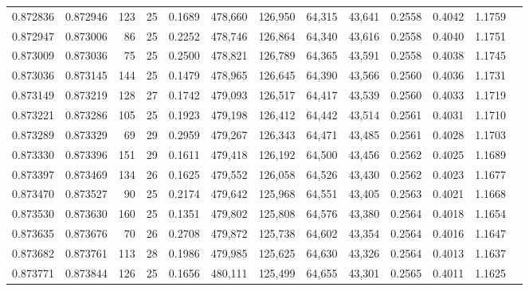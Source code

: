 \begin{tabular}{rrrrrrrrrrrrr}
0.872836 & 0.872946 &   123 &  25 &                                     0.1689 & 478,660 & 126,950 &  64,315 &  43,641 & 0.2558 & 0.4042 & 1.1759 \\
0.872947 & 0.873006 &    86 &  25 &                                     0.2252 & 478,746 & 126,864 &  64,340 &  43,616 & 0.2558 & 0.4040 & 1.1751 \\
0.873009 & 0.873036 &    75 &  25 &                                     0.2500 & 478,821 & 126,789 &  64,365 &  43,591 & 0.2558 & 0.4038 & 1.1745 \\
0.873036 & 0.873145 &   144 &  25 &                                     0.1479 & 478,965 & 126,645 &  64,390 &  43,566 & 0.2560 & 0.4036 & 1.1731 \\
0.873149 & 0.873219 &   128 &  27 &                                     0.1742 & 479,093 & 126,517 &  64,417 &  43,539 & 0.2560 & 0.4033 & 1.1719 \\
0.873221 & 0.873286 &   105 &  25 &                                     0.1923 & 479,198 & 126,412 &  64,442 &  43,514 & 0.2561 & 0.4031 & 1.1710 \\
0.873289 & 0.873329 &    69 &  29 &                                     0.2959 & 479,267 & 126,343 &  64,471 &  43,485 & 0.2561 & 0.4028 & 1.1703 \\
0.873330 & 0.873396 &   151 &  29 &                                     0.1611 & 479,418 & 126,192 &  64,500 &  43,456 & 0.2562 & 0.4025 & 1.1689 \\
0.873397 & 0.873469 &   134 &  26 &                                     0.1625 & 479,552 & 126,058 &  64,526 &  43,430 & 0.2562 & 0.4023 & 1.1677 \\
0.873470 & 0.873527 &    90 &  25 &                                     0.2174 & 479,642 & 125,968 &  64,551 &  43,405 & 0.2563 & 0.4021 & 1.1668 \\
0.873530 & 0.873630 &   160 &  25 &                                     0.1351 & 479,802 & 125,808 &  64,576 &  43,380 & 0.2564 & 0.4018 & 1.1654 \\
0.873635 & 0.873676 &    70 &  26 &                                     0.2708 & 479,872 & 125,738 &  64,602 &  43,354 & 0.2564 & 0.4016 & 1.1647 \\
0.873682 & 0.873761 &   113 &  28 &                                     0.1986 & 479,985 & 125,625 &  64,630 &  43,326 & 0.2564 & 0.4013 & 1.1637 \\
0.873771 & 0.873844 &   126 &  25 &                                     0.1656 & 480,111 & 125,499 &  64,655 &  43,301 & 0.2565 & 0.4011 & 1.1625 \\

\end{tabular}
